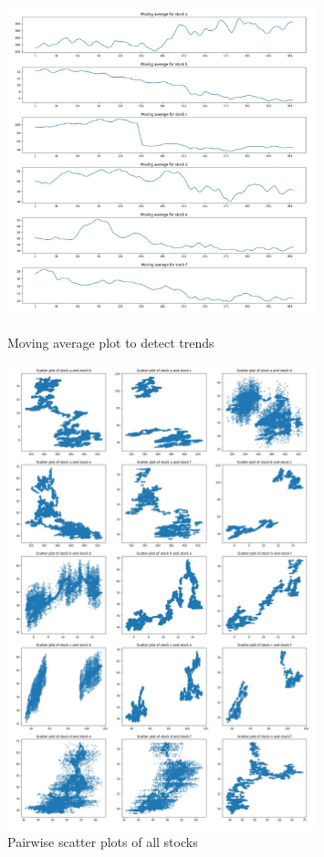 \documentclass{article}
\begin{document}
\begin{figure}[htb]
	\begin{minipage}{0.5\textwidth}
		\centering
		\includegraphics[width=0.8\textwidth, height=0.8\textwidth]{moving_average.jpg}
		\caption{Moving average plot to detect trends}
		\label{fig3}
	\end{minipage}
	\begin{minipage}{0.5\textwidth}
		\includegraphics[width=0.8\textwidth, height=0.8\textwidth]{pairwise_scatter.jpg}
		\caption{Pairwise scatter plots of all stocks}
		\label{fig4}
	\end{minipage}
\end{figure}
\end{document}
